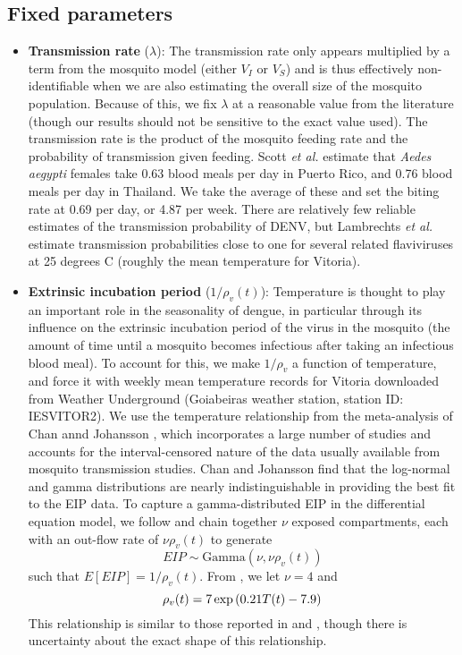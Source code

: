 \documentclass[12pt,letterpaper]{article}
\begin{document}
\subsection*{Fixed parameters}

\begin{itemize}
\item \textbf{Transmission rate} ($\lambda$): The transmission rate only appears multiplied by a term from the mosquito model (either $V_I$ or $V_S$) and is thus effectively non-identifiable when we are also estimating the overall size of the mosquito population.
Because of this, we fix $\lambda$ at a reasonable value from the literature (though our results should not be sensitive to the exact value used).
The transmission rate is the product of the mosquito feeding rate and the probability of transmission given feeding.
Scott \textit{et al.} \cite{Scott2000} estimate that \textit{Aedes aegypti} females take 0.63 blood meals per day in Puerto Rico, and 0.76 blood meals per day in Thailand.
We take the average of these and set the biting rate at 0.69 per day, or 4.87 per week.
There are relatively few reliable estimates of the transmission probability of DENV, but Lambrechts \textit{et al.} \cite{Lambrechts2011} estimate transmission probabilities close to one  for several related flaviviruses at 25 degrees C (roughly the mean temperature for Vitoria).
\\
\item \textbf{Extrinsic incubation period} ($1/\rho_{v}(t)$): Temperature is thought to play an important role in the seasonality of dengue, in particular through its influence on the extrinsic incubation period of the virus in the mosquito  (the amount of time until a mosquito becomes infectious after taking an infectious blood meal).
To account for this, we make $1/\rho_v$ a function of temperature, and force it with weekly mean temperature records for Vitoria downloaded from Weather Underground (Goiabeiras weather station, station ID: IESVITOR2).
We use the temperature relationship from the meta-analysis of Chan annd Johansson \cite{Chan2012}, which incorporates a large number of studies and accounts for the interval-censored nature of the data usually available from mosquito transmission studies.
Chan and Johansson find that the log-normal and gamma distributions are nearly indistinguishable in providing the best fit to the EIP data.
To capture a gamma-distributed EIP in the differential equation model, we follow \cite{Lloyd2001} and chain together $\nu$ exposed compartments, each with an out-flow rate of $\nu\rho_v(t)$ to generate
\begin{equation}
EIP \sim \text{Gamma}(\nu, \nu \rho_v(t))
\end{equation}
such that $E[EIP] = 1/ \rho_v(t)$.
From \cite{Chan2012}, we let $\nu = 4$ and 
\begin{equation}
\rho_v(t) = 7\exp \left(0.21T(t) - 7.9\right)\\
\end{equation}
This relationship is similar to those reported in \cite{Focks1995} and \cite{Tjaden2013}, though there is uncertainty about the exact shape of this relationship.
\end{itemize}



\end{document}
